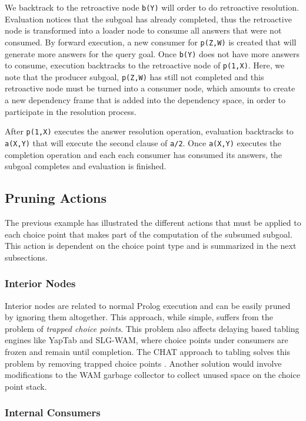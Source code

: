 We backtrack to the retroactive node \texttt{b(Y)} will order to do retroactive resolution. Evaluation
notices that the subgoal has already completed, thus the retroactive node is transformed into a loader node
to consume all answers that were not consumed. By forward execution, a new consumer for \texttt{p(Z,W)} is
created that will generate more answers for the query goal. Once \texttt{b(Y)} does not have more answers
to consume, execution backtracks to the retroactive node of \texttt{p(1,X)}. Here, we note that
the producer subgoal, \texttt{p(Z,W)} has still not completed and this retroactive node must be turned
into a consumer node, which amounts to create a new dependency frame that is added into the dependency space,
in order to participate in the resolution process.

After \texttt{p(1,X)} executes the answer resolution
operation, evaluation backtracks to \texttt{a(X,Y)} that will execute the second clause of \texttt{a/2}.
Once \texttt{a(X,Y)} executes the completion operation and each each consumer has consumed its answers,
the subgoal completes and evaluation is finished.

\subsection{Pruning Actions}

The previous example has illustrated the different actions that must be applied to each choice point that
makes part of the computation of the subsumed subgoal. This action is dependent on the choice point
type and is summarized in the next subsections.

\subsubsection{Interior Nodes}

Interior nodes are related to normal Prolog execution and can be easily pruned
by ignoring them altogether. This approach, while simple, suffers from the problem of \textit{trapped
choice points}. This problem also affects delaying based tabling engines like YapTab and SLG-WAM, where
choice points under consumers are frozen and remain until completion. The CHAT approach to tabling
solves this problem by removing trapped choice points \cite{Demoen-99b}. Another solution would involve
modifications to the WAM garbage collector to collect unused space on the choice point stack.


\subsubsection{Internal Consumers}   
   
